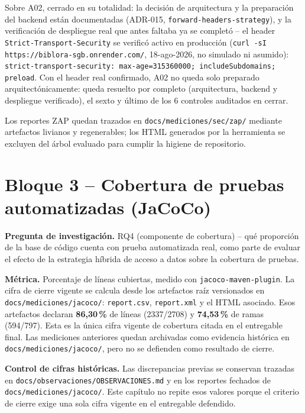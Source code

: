 Sobre A02, cerrado en su totalidad: la decisión de arquitectura y la
preparación del backend están documentadas (ADR-015,
\texttt{forward-headers-strategy}), y la verificación de despliegue
real que antes faltaba ya se completó -- el header
\texttt{Strict-Transport-Security} se verificó activo en producción
(\texttt{curl -sI https://biblora-sgb.onrender.com/}, 18-ago-2026, no
simulado ni asumido):
\texttt{strict-transport-security: max-age=315360000;\allowbreak
includeSubdomains; preload}. Con el header real confirmado, A02 no
queda solo preparado arquitectónicamente: queda resuelto por completo
(arquitectura, backend y despliegue verificado), el sexto y último de
los 6 controles auditados en cerrar.

Los reportes ZAP quedan trazados en
\texttt{docs/mediciones/sec/zap/} mediante artefactos livianos y
regenerables; los HTML generados por la herramienta se excluyen del
árbol evaluado para cumplir la higiene de repositorio.

\section{Bloque 3 -- Cobertura de pruebas automatizadas (JaCoCo)}
\label{sec:res-cobertura}

\textbf{Pregunta de investigación.} RQ4 (componente de cobertura) -- qué
proporción de la base de código cuenta con prueba automatizada real, como
parte de evaluar el efecto de la estrategia híbrida de acceso a datos
sobre la cobertura de pruebas.

\textbf{Métrica.} Porcentaje de líneas cubiertas, medido con
\texttt{jacoco-maven-plugin}. La cifra de cierre vigente se calcula
desde los artefactos raíz versionados en \texttt{docs/mediciones/jacoco/}:
\texttt{report.csv}, \texttt{report.xml} y el HTML asociado. Esos
artefactos declaran \textbf{86,30\,\%} de líneas (2337/2708) y
\textbf{74,53\,\%} de ramas (594/797). Esta es la única cifra vigente de
cobertura citada en el entregable final. Las mediciones anteriores quedan
archivadas como evidencia histórica en \texttt{docs/mediciones/jacoco/},
pero no se defienden como resultado de cierre.

\textbf{Control de cifras históricas.} Las discrepancias previas se
conservan trazadas en \texttt{docs/observaciones/OBSERVACIONES.md} y en
los reportes fechados de \texttt{docs/mediciones/jacoco/}. Este capítulo
no repite esos valores porque el criterio de cierre exige una sola cifra
vigente en el entregable defendido.

